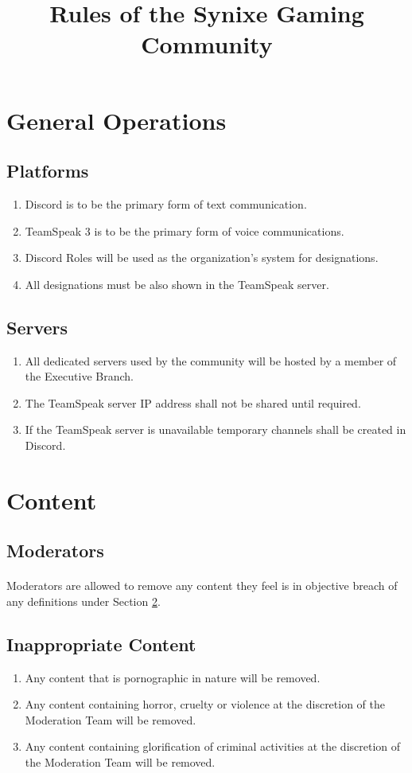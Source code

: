 \documentclass[10pt,a4paper]{article}
\title{Rules of the Synixe Gaming Community}
\begin{document}
\maketitle
\newpage

\section{General Operations}
\subsection{Platforms}
\begin{enumerate}
	\item Discord is to be the primary form of text communication.
	\item TeamSpeak 3 is to be the primary form of voice communications.
	\item Discord Roles will be used as the organization's system for designations.
	\item All designations must be also shown in the TeamSpeak server.
\end{enumerate}
\subsection{Servers}
\begin{enumerate}
	\item All dedicated servers used by the community will be hosted by a member of the Executive Branch.
	\item The TeamSpeak server IP address shall not be shared until required.
	\item If the TeamSpeak server is unavailable temporary channels shall be created in Discord.
\end{enumerate}
\section{Content} \label{content}
\subsection{Moderators}
\paragraph{}
Moderators are allowed to remove any content they feel is in objective breach of any definitions under Section \ref{content}.
\subsection{Inappropriate Content}
\begin{enumerate}
	\item Any content that is pornographic in nature will be removed.
	\item Any content containing horror, cruelty or violence at the discretion of the Moderation Team will be removed.
	\item Any content containing glorification of criminal activities at the discretion of the Moderation Team will be removed.
\end{enumerate}
\end{document}
